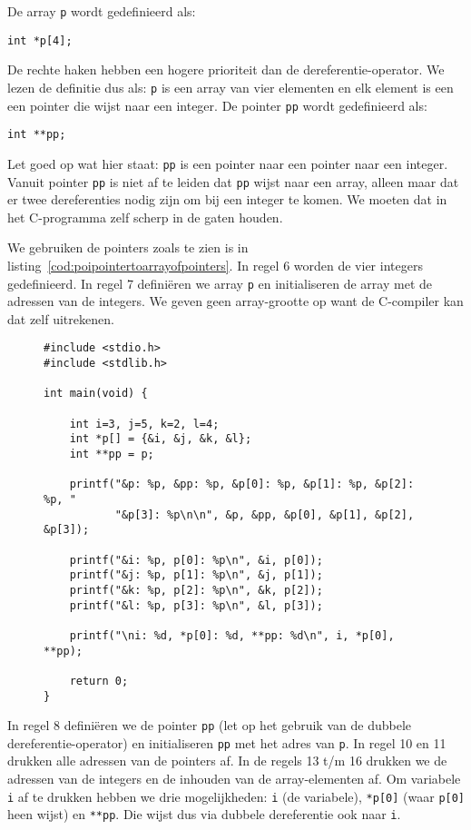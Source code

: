 De array \texttt{p} wordt gedefinieerd als:

\hspace*{1em}\texttt{int *p[4];}

De rechte haken hebben een hogere prioriteit dan de dereferentie-operator. We lezen de definitie dus als: \texttt{p} is een array van vier elementen en elk element is een een pointer die wijst naar een integer. De pointer \texttt{pp} wordt gedefinieerd als:

\hspace*{1em}\texttt{int **pp;}

Let goed op wat hier staat: \texttt{pp} is een pointer naar een pointer naar een integer. Vanuit pointer \texttt{pp} is niet af te leiden dat \texttt{pp} wijst naar een array, alleen maar dat er twee dereferenties nodig zijn om bij een integer te komen. We moeten dat in het C-programma zelf scherp in de gaten houden.

We gebruiken de pointers zoals te zien is in listing~\ref{cod:poipointertoarrayofpointers}. In regel 6 worden de vier integers gedefinieerd. In regel 7 definiëren we array \texttt{p} en initialiseren de array met de adressen van de integers. We geven geen array-grootte op want de C-compiler kan dat zelf uitrekenen.

\begin{figure}[!ht]
\begin{lstlisting}[caption=Voorbeeld van het gebruik van pointers.,label=cod:poipointertoarrayofpointers]
#include <stdio.h>
#include <stdlib.h>

int main(void) {

    int i=3, j=5, k=2, l=4;
    int *p[] = {&i, &j, &k, &l};
    int **pp = p;

    printf("&p: %p, &pp: %p, &p[0]: %p, &p[1]: %p, &p[2]: %p, "
           "&p[3]: %p\n\n", &p, &pp, &p[0], &p[1], &p[2], &p[3]);

    printf("&i: %p, p[0]: %p\n", &i, p[0]);
    printf("&j: %p, p[1]: %p\n", &j, p[1]);
    printf("&k: %p, p[2]: %p\n", &k, p[2]);
    printf("&l: %p, p[3]: %p\n", &l, p[3]);

    printf("\ni: %d, *p[0]: %d, **pp: %d\n", i, *p[0], **pp);

    return 0;
}
\end{lstlisting}
\end{figure}

In regel 8 definiëren we de pointer \texttt{pp} (let op het gebruik van de dubbele dereferentie-operator) en initialiseren \texttt{pp} met het adres van \texttt{p}. In regel 10 en 11 drukken alle adressen van de pointers af. In de regels 13 t/m 16 drukken we de adressen van de integers en de inhouden van de array-elementen af. Om variabele \texttt{i} af te drukken hebben we drie mogelijkheden: \texttt{i} (de variabele), \texttt{*p[0]} (waar \texttt{p[0]} heen wijst) en \texttt{**pp}. Die wijst dus via dubbele dereferentie ook naar \texttt{i}.

